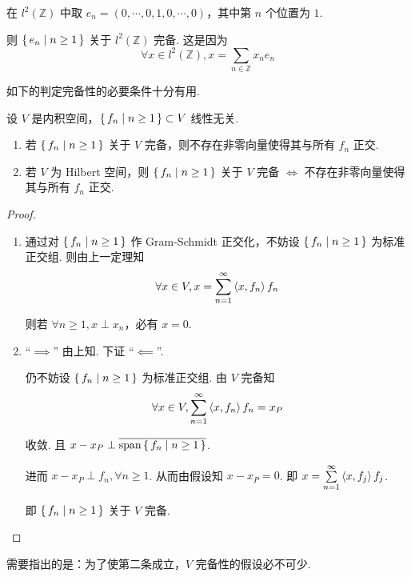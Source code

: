 \begin{example}
    在 $l^2(\mathbb{Z})$ 中取 $e_n=(0,\cdots,0,1,0,\cdots,0)$，其中第 $n$ 个位置为 $1$.

    则 $\set{e_n|n\ge 1}$ 关于 $l^2(\mathbb{Z})$ 完备. 这是因为
$$
\forall x\in l^2(\mathbb{Z}),x=\sum_{n\in\mathbb{Z}}x_ne_n
$$
\end{example}

如下的判定完备性的必要条件十分有用.

\begin{property}
    设 $V$ 是内积空间，$\set{f_n|n\ge 1}\subset V$ 线性无关.

    \begin{enumerate}
        \item 若 $\set{f_n|n\ge 1}$ 关于 $V$ 完备，则不存在非零向量使得其与所有 $f_n$ 正交.
        
        \item 若 $V$ 为 Hilbert 空间，则 $\set{f_n|n\ge 1}$ 关于 $V$ 完备 $\iff$ 不存在非零向量使得其与所有 $f_n$ 正交.
    \end{enumerate}
\end{property}
\begin{proof}
    \begin{enumerate}
        \item 通过对 $\set{f_n|n\ge 1}$ 作 Gram-Schmidt 正交化，不妨设 $\set{f_n|n\ge 1}$ 为标准正交组. 则由上一定理知
$$
\forall x\in V,x=\sum_{n=1}^\infty\left\langle{x,f_n}\right\rangle f_n
$$

        则若 $\forall n\ge 1,x\perp x_n$，必有 $x=0$.

        \item “$\implies$” 由上知. 下证 “$\impliedby$”.
        
        仍不妨设 $\set{f_n|n\ge 1}$ 为标准正交组. 由 $V$ 完备知
$$
\forall x\in V,\sum_{n=1}^\infty\left\langle{x,f_n}\right\rangle f_n=x_P
$$

        收敛. 且 $x-x_P\perp\overline{\mathrm{span}\set{f_n|n\ge 1}}$.

        进而 $x-x_P\perp f_n,\forall n\ge 1$. 从而由假设知 $x-x_P=0$. 即 $x=\sum\limits_{n=1}^\infty\left\langle{x,f_j}\right\rangle f_j$.

        即 $\set{f_n|n\ge 1}$ 关于 $V$ 完备.
    \end{enumerate}
\end{proof}

\begin{hint}
    需要指出的是：为了使第二条成立，$V$ 完备性的假设必不可少.
\end{hint}